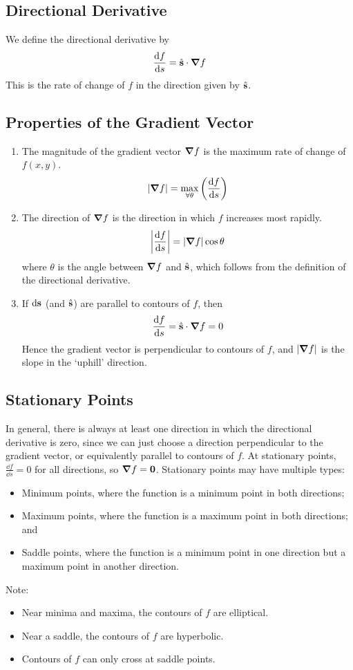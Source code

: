 \documentclass{article}
\begin{document}
\subsection{Directional Derivative}
We define the directional derivative by
\[ \frac{\dd{f}}{\dd{s}} = \hat{\vb s} \cdot \grad f \]
This is the rate of change of $f$ in the direction given by $\hat{\vb s}$.

\subsection{Properties of the Gradient Vector}
\begin{enumerate}
	\item The magnitude of the gradient vector $\grad f$ is the maximum rate of change of $f(x, y)$.
	      \[ \abs{\grad f} = \max\limits_{\forall \theta} \left( \frac{\dd{f}}{\dd{s}} \right) \]
	\item The direction of $\grad f$ is the direction in which $f$ increases most rapidly.
	      \[ \abs{\frac{\dd{f}}{\dd{s}}} = \abs{\grad f}\cos\theta \]
	      where $\theta$ is the angle between $\grad f$ and $\hat{\vb s}$, which follows from the definition of the directional derivative.
	\item If $\dd \vb s$ (and $\hat{\vb s}$) are parallel to contours of $f$, then
	      \[ \frac{\dd{f}}{\dd{s}} = \hat{\vb s} \cdot \grad f = 0 \]
	      Hence the gradient vector is perpendicular to contours of $f$, and $\abs{\grad f}$ is the slope in the `uphill' direction.
\end{enumerate}

\subsection{Stationary Points}
In general, there is always at least one direction in which the directional derivative is zero, since we can just choose a direction perpendicular to the gradient vector, or equivalently parallel to contours of $f$. At stationary points, $\frac{\dd{f}}{\dd{s}} = 0$ for all directions, so $\grad f = \vb 0$. Stationary points may have multiple types:
\begin{itemize}
	\item Minimum points, where the function is a minimum point in both directions;
	\item Maximum points, where the function is a maximum point in both directions; and
	\item Saddle points, where the function is a minimum point in one direction but a maximum point in another direction.
\end{itemize}
Note:
\begin{itemize}
	\item Near minima and maxima, the contours of $f$ are elliptical.
	\item Near a saddle, the contours of $f$ are hyperbolic.
	\item Contours of $f$ can only cross at saddle points.
\end{itemize}
\end{document}
